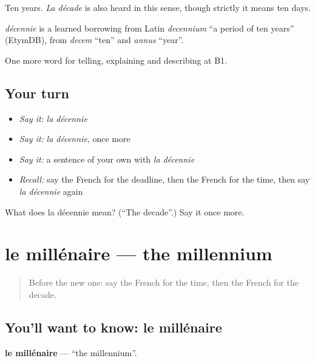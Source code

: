 Ten years. \emph{La décade} is also heard in this sense, though strictly it means ten days.

\begin{cousinweb}
\emph{décennie} is a learned borrowing from Latin \emph{decennium} \textquotedblleft{}a period of ten years\textquotedblright{} (EtymDB), from \emph{decem} \textquotedblleft{}ten\textquotedblright{} and \emph{annus} \textquotedblleft{}year\textquotedblright{}.
\end{cousinweb}

\begin{grammarlens}[title={What you've built}]
One more word for telling, explaining and describing at B1.
\end{grammarlens}

\subsection*{Your turn}
\begin{itemize}
\raggedright
  \item \emph{Say it:} \emph{la décennie}
  \item \emph{Say it:} \emph{la décennie}, once more
  \item \emph{Say it:} a sentence of your own with \emph{la décennie}
  \item \emph{Recall:} say the French for the deadline, then the French for the time, then say \emph{la décennie} again
\end{itemize}

\begin{tcolorbox}[breakable,colback=teal!4,colframe=teal!35!black,title={Before you move on}]
What does la décennie mean? (\textquotedblleft{}The decade\textquotedblright{}.) Say it once more.
\end{tcolorbox}
\section[le millénaire]{le millénaire — the millennium}

\label{lesson:FR-C276-millenaire}



\begin{quote}
Before the new one: say the French for the time, then the French for the decade.
\end{quote}

\subsection*{You'll want to know: le millénaire}
\textbf{le millénaire} — \textquotedblleft{}the millennium\textquotedblright{}.

